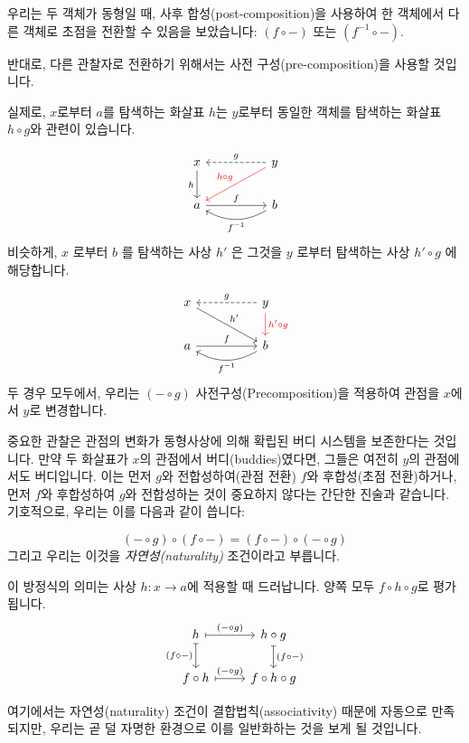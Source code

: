 \documentclass[DaoFP]{subfiles}
\begin{document}
우리는 두 객체가 동형일 때, 사후 합성(post-composition)을 사용하여 한 객체에서 다른 객체로 초점을 전환할 수 있음을 보았습니다: $(f \circ -)$ 또는 $(f^{-1} \circ -)$.

반대로, 다른 관찰자로 전환하기 위해서는 사전 구성(pre-composition)을 사용할 것입니다.

실제로, $x$로부터 $a$를 탐색하는 화살표 $h$는 $y$로부터 동일한 객체를 탐색하는 화살표 $h\circ g$와 관련이 있습니다.

\[
 \begin{tikzcd}
 x
 \arrow[d, "h"']
 && y
 \arrow[ll, dashed, "g"']
  \arrow[dll, red, "h \circ g"']
 \\
 a
 \arrow[rr, "f"]
  && b
 \arrow[ll, bend left,  "f^{-1}"]
 \end{tikzcd}
\]
비슷하게, $x$ 로부터 $b$ 를 탐색하는 사상 $h'$ 은 그것을 $y$ 로부터 탐색하는 사상 $h' \circ g$ 에 해당합니다.

\[
 \begin{tikzcd}
 x
 \arrow[drr, "h'"]
 && y
 \arrow[ll, dashed, "g"']
  \arrow[d, red, "h' \circ g"]
 \\
 a
 \arrow[rr, "f"]
  && b
 \arrow[ll, bend left,  "f^{-1}"]
 \end{tikzcd}
\]
두 경우 모두에서, 우리는 $(- \circ g)$ 사전구성(Precomposition)을 적용하여 관점을 $x$에서 $y$로 변경합니다.

중요한 관찰은 관점의 변화가 동형사상에 의해 확립된 버디 시스템을 보존한다는 것입니다. 만약 두 화살표가 $x$의 관점에서 버디(buddies)였다면, 그들은 여전히 $y$의 관점에서도 버디입니다. 이는 먼저 $g$와 전합성하여(관점 전환) $f$와 후합성(초점 전환)하거나, 먼저 $f$와 후합성하여 $g$와 전합성하는 것이 중요하지 않다는 간단한 진술과 같습니다. 기호적으로, 우리는 이를 다음과 같이 씁니다:

\[(- \circ g) \circ (f \circ -) = (f \circ -) \circ (- \circ g)\]
그리고 우리는 이것을 \emph{자연성(naturality)} 조건이라고 부릅니다.


이 방정식의 의미는 사상 $h \colon x \to a$에 적용할 때 드러납니다. 양쪽 모두 $f \circ h \circ g$로 평가됩니다.
\[
 \begin{tikzcd}
 h
 \arrow[r, mapsto, "(- \circ g)"]
 \arrow[d, mapsto, "(f \circ -)"']
 & h \circ g
 \arrow[d, mapsto, "(f \circ -)"]
 \\
 f \circ h
 \arrow[r, mapsto, "(- \circ g)"]
& f \circ h \circ g
 \end{tikzcd}
\]

여기에서는 자연성(naturality) 조건이 결합법칙(associativity) 때문에 자동으로 만족되지만, 우리는 곧 덜 자명한 환경으로 이를 일반화하는 것을 보게 될 것입니다.
\end{document}
